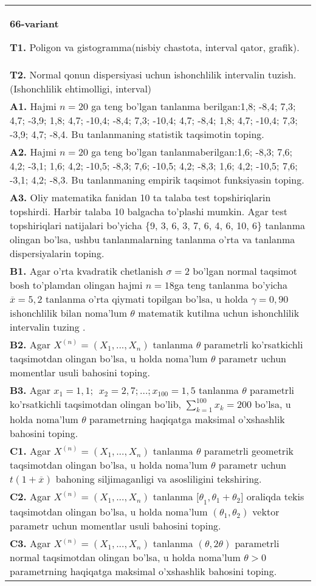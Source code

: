 \documentclass{article}
\begin{document}
\begin{tabular}{m{17cm}}
\textbf{66-variant}
\newline

\textbf{T1.} 
Poligon va gistogramma(nisbiy chastota, interval qator, grafik).
\\
\textbf{T2.} 
Normal qonun dispersiyasi uchun ishonchlilik intervalin tuzish. (Ishonchlilik ehtimolligi, interval)
\\
\textbf{A1.} 
Hajmi \(n = 20\) ga teng bo'lgan tanlanma berilgan:1,8; -8,4; 7,3; 4,7; -3,9; 1,8; 4,7; -10,4; -8,4; 7,3; -10,4; 4,7; -8,4; 1,8; 4,7; -10,4; 7,3; -3,9; 4,7; -8,4. Bu tanlanmaning statistik taqsimotin toping.
\\
\textbf{A2.} 
Hajmi \(n = 20\) ga teng bo'lgan tanlanmaberilgan:1,6; -8,3; 7,6; 4,2; -3,1; 1,6; 4,2; -10,5; -8,3; 7,6; -10,5; 4,2; -8,3; 1,6; 4,2; -10,5; 7,6; -3,1; 4,2; -8,3. Bu tanlanmaning empirik taqsimot funksiyasin toping.
\\
\textbf{A3.} 
Oliy matematika fanidan 10 ta talaba test topshiriqlarin topshirdi. Harbir talaba 10 balgacha to'plashi mumkin. Agar test topshiriqlari natijalari bo'yicha \{9, 3, 6, 3, 7, 6, 4, 6, 10, 6\} tanlanma olingan bo'lsa, ushbu tanlanmalarning tanlanma o'rta va tanlanma dispersiyalarin toping.
\\
\textbf{B1.} 
Agar o'rta kvadratik chetlanish \(\sigma = 2\) bo'lgan normal taqsimot bosh to'plamdan olingan hajmi \(n = 18\)ga teng tanlanma bo'yicha \(\overline{x} = 5,2\) tanlanma o'rta qiymati topilgan bo'lsa, u holda \(\gamma = 0,90\) ishonchlilik bilan noma'lum \(\theta\) matematik kutilma uchun ishonchlilik intervalin tuzing .
\\
\textbf{B2.} 
Agar \(X^{(n)} = \left( X_{1},...,X_{n} \right)\) tanlanma \(\theta\) parametrli ko'rsatkichli taqsimotdan olingan bo'lsa, u holda noma'lum \(\theta\) parametr uchun momentlar usuli bahosini toping.
\\
\textbf{B3.} 
Agar \(x_{1} = 1,1;\ \ x_{2} = 2,7;\ldots;x_{100} = 1,5\) tanlanma \(\theta\) parametrli ko'rsatkichli taqsimotdan olingan bo'lib, \(\sum_{k = 1}^{100}x_{k} = 200\) bo'lsa, u holda noma'lum \(\theta\) parametrning haqiqatga maksimal o'xshashlik bahosini toping.
\\
\textbf{C1.} 
Agar \(X^{(n)} = \left( X_{1},...,X_{n} \right)\) tanlanma \(\theta\) parametrli geometrik taqsimotdan olingan bo'lsa, u holda noma'lum \(\theta\) parametr uchun \(t(1 + \overline{x})\) bahoning siljimaganligi va asosliligini tekshiring.
\\
\textbf{C2.} 
Agar \(X^{(n)} = \left( X_{1},...,X_{n} \right)\) tanlanma \({\lbrack\theta}_{1},\theta_{1} + \theta_{2}\rbrack\) oraliqda tekis taqsimotdan olingan bo'lsa, u holda noma'lum \(\left( \theta_{1},\theta_{2} \right)\) vektor parametr uchun momentlar usuli bahosini toping.
\\
\textbf{C3.} 
Agar \(X^{(n)} = \left( X_{1},...,X_{n} \right)\) tanlanma \((\theta,2\theta)\) parametrli normal taqsimotdan olingan bo'lsa, u holda noma'lum \(\theta > 0\) parametrning haqiqatga maksimal o'xshashlik bahosini toping.
\\

\end{tabular}
\vspace{1cm}
\end{document}
